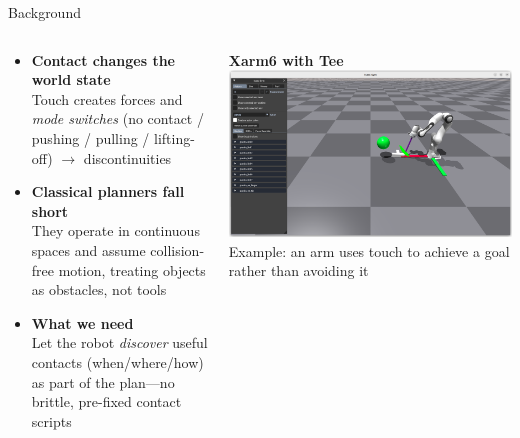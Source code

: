 \documentclass[10pt, aspectratio=169]{beamer}
\begin{document}
\begin{frame}{Background}
\begin{columns}
  \begin{column}{0.56\textwidth}
    \small
    \begin{itemize}
      \item \textbf{Contact changes the world state} \\
      Touch creates forces and \emph{mode switches} (no contact / pushing / pulling / lifting-off) $\rightarrow$ discontinuities
      \vspace{0.5em}
      \item \textbf{Classical planners fall short} \\ 
      They operate in continuous spaces and assume collision-free motion, treating objects as obstacles, not tools
      \vspace{0.5em}
      \item \textbf{What we need} \\ 
      Let the robot \emph{discover} useful contacts (when/where/how) as part of the plan—no brittle, pre-fixed contact scripts
    \end{itemize}
  \end{column}
  \begin{column}{0.44\textwidth}
    \centering
    {\bfseries Xarm6 with Tee}\\[0.3em]
    \includegraphics[width=\linewidth]{Figures/Xarm6_tee.png}\\
    \vspace{0.25em}
    \scriptsize Example: an arm uses touch to achieve a goal rather than avoiding it
  \end{column}
\end{columns}
\end{frame}
\end{document}
